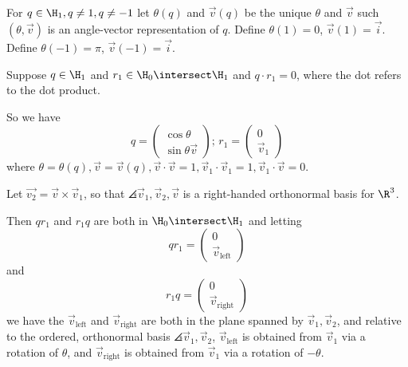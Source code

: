 \documentclass[oneside,12pt]{amsart}
\begin{document}
\begin{definition}
For $q\in\H_1, q \not= 1, q\not=-1$ let $\theta(q)$ and $\vec{v}(q)$ be the unique
$\theta$ and $\vec{v}$ such $(\theta,\vec{v})$
is an angle-vector representation of $q$. Define $\theta(1)=0$, $\vec{v}(1)=\vec{i}$.
Define $\theta(-1)=\pi$, $\vec{v}(-1)=\vec{i}$.
\end{definition}

\begin{lemma}
\label{lemma:mult_is_rot}
Suppose $q\in\H_1$ and $r_1\in\H_0\intersect\H_1$ and $q \cdot r_1 = 0$, where the dot refers to the dot product.

So we have
$$
q = \begin{pmatrix} \cos \theta \\ \sin \theta \vec{v} \end{pmatrix}\text{; }
r_1 = \begin{pmatrix} 0 \\ \vec{v}_1 \end{pmatrix}
$$
where $\theta=\theta(q), \vec{v} = \vec{v}(q), \vec{v} \cdot \vec{v} = 1,\vec{v}_1 \cdot \vec{v}_1 = 1, \vec{v}_1 \cdot \vec{v} = 0.$


Let $\vec{v_2} = \vec{v} \times  \vec{v}_1$, so that $\angles{\vec{v}_1,\vec{v}_2,\vec{v}}$ is a right-handed orthonormal basis for $\R^3$.

Then $q r_1$ and $r_1 q$ are both in $\H_0\intersect\H_1$ and letting
$$ q r_1 = \begin{pmatrix} 0 \\ \vec{v}_{\text{left}} \end{pmatrix}$$
and 
$$ r_1 q = \begin{pmatrix} 0 \\ \vec{v}_{\text{right}} \end{pmatrix}$$
we have the $\vec{v}_{\text{left}}$ and $\vec{v}_{\text{right}}$ are both in the plane spanned by $\vec{v}_1,\vec{v}_2$, and
relative to the ordered, orthonormal basis $\angles{\vec{v}_1,\vec{v}_2}$,
$\vec{v}_{\text{left}}$ is obtained from $\vec{v}_1$ via a rotation of $\theta$, and $\vec{v}_{\text{right}}$
is obtained from $\vec{v}_1$ via a rotation of $-\theta$.
\end{lemma}
\end{document}
